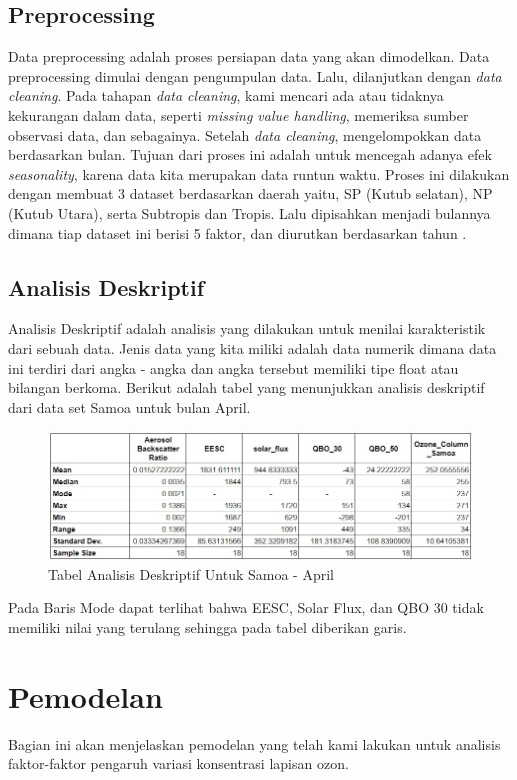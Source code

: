 \begin{enumerate}
\subsection{Preprocessing}
Data preprocessing adalah proses persiapan data yang akan dimodelkan. Data preprocessing dimulai dengan pengumpulan data. Lalu, dilanjutkan dengan \textit{data cleaning}. Pada tahapan \textit{data cleaning}, kami mencari ada atau tidaknya kekurangan dalam data, seperti \textit{missing value handling}, memeriksa sumber observasi data, dan sebagainya.
Setelah \textit{data cleaning}, mengelompokkan data berdasarkan bulan. Tujuan dari proses ini adalah untuk mencegah adanya efek \textit{seasonality}, karena data kita merupakan data runtun waktu. Proses ini dilakukan dengan membuat 3 dataset berdasarkan daerah yaitu, SP (Kutub selatan), NP (Kutub Utara), serta Subtropis dan Tropis. Lalu dipisahkan menjadi bulannya dimana tiap dataset ini berisi 5 faktor, dan diurutkan berdasarkan tahun .
\subsection{Analisis Deskriptif}
Analisis Deskriptif adalah analisis yang dilakukan untuk menilai karakteristik dari sebuah data. Jenis data yang kita miliki adalah data numerik dimana data ini terdiri dari angka - angka dan angka tersebut memiliki tipe float atau bilangan berkoma. Berikut adalah tabel yang menunjukkan analisis deskriptif dari data set Samoa untuk bulan April.
\begin{figure}[h!]
    \centering
    \includegraphics[scale=0.45]{src/Pics/SamoApril.jpeg}
    \caption{Tabel Analisis Deskriptif Untuk Samoa - April}
    \label{fig:my_label}
\end{figure}
Pada Baris Mode dapat terlihat bahwa EESC, Solar Flux, dan QBO 30 tidak memiliki nilai yang terulang sehingga pada tabel diberikan garis.
\section{Pemodelan}
Bagian ini akan menjelaskan pemodelan yang telah kami lakukan untuk analisis faktor-faktor pengaruh variasi konsentrasi lapisan ozon.


\end{enumerate}
